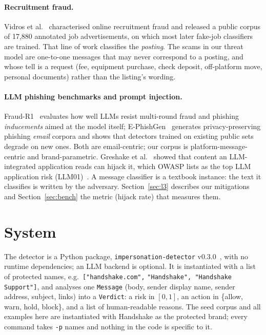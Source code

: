 \documentclass[10pt,twocolumn]{article}
\newcommand{\code}[1]{\texttt{#1}}
\begin{document}
\paragraph{Recruitment fraud.}
Vidros et al.~\cite{vidros2017recruitment} characterised online recruitment fraud and released a public corpus of 17{,}880 annotated job advertisements, on which most later fake-job classifiers are trained. That line of work classifies the \emph{posting}. The scams in our threat model are one-to-one messages that may never correspond to a posting, and whose tell is a request (fee, equipment purchase, check deposit, off-platform move, personal documents) rather than the listing's wording.

\paragraph{LLM phishing benchmarks and prompt injection.}
Fraud-R1~\cite{yang2025fraudr1} evaluates how well LLMs resist multi-round fraud and phishing \emph{inducements} aimed at the model itself; E-PhishGen~\cite{pajola2025ephishgen} generates privacy-preserving phishing \emph{email} corpora and shows that detectors trained on existing public sets degrade on new ones. Both are email-centric; our corpus is platform-message-centric and brand-parametric. Greshake et al.~\cite{greshake2023indirect} showed that content an LLM-integrated application reads can hijack it, which OWASP lists as the top LLM application risk (LLM01)~\cite{owasp_llm01}. A message classifier is a textbook instance: the text it classifies is written by the adversary. Section~\ref{sec:l3} describes our mitigations and Section~\ref{sec:bench} the metric (hijack rate) that measures them.

\section{System}
\label{sec:system}

\sloppypar The detector is a Python package, \code{impersonation-detector} v0.3.0~\cite{ezema2026detector}, with no runtime dependencies; an LLM backend is optional. It is instantiated with a list of protected names, e.g.\ \code{["handshake.com",} \code{"Handshake", "Handshake Support"]}, and analyses one \code{Message} (body, sender display name, sender address, subject, links) into a \code{Verdict}: a risk in $[0,1]$, an action in \{allow, warn, hold, block\}, and a list of human-readable reasons. The seed corpus and all examples here are instantiated with Handshake as the protected brand; every command takes \code{-p} names and nothing in the code is specific to it.
\end{document}
